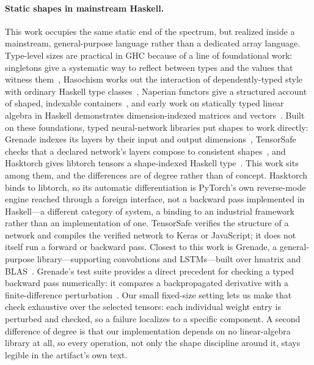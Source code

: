 \documentclass[sigconf,nonacm]{acmart}
\begin{document}
\paragraph{Static shapes in mainstream Haskell.}
This work occupies the same static end of the spectrum, but realized inside a
mainstream, general-purpose language rather than a dedicated array language.
Type-level sizes are practical in GHC because of a line of foundational work:
singletons give a systematic way to reflect between types and the values that
witness them~\cite{eisenberg2012singletons}, Hasochism works out the
interaction of dependently-typed style with ordinary Haskell type
classes~\cite{lindley2013hasochism}, Naperian functors give a structured
account of shaped, indexable containers~\cite{gibbons2017naperian}, and early
work on statically typed linear algebra in Haskell demonstrates
dimension-indexed matrices and vectors~\cite{eaton2006linalg}. Built on these
foundations, typed neural-network libraries put shapes to work directly:
Grenade indexes its layers by their input and output
dimensions~\cite{campbell2016grenade}, TensorSafe checks that a declared
network's layers compose to consistent shapes~\cite{pineyro2019tensorsafe,
pineyro2021tensorsafe}, and Hasktorch gives libtorch tensors a shape-indexed
Haskell type~\cite{hasktorch}. This work sits among them, and the differences
are of degree rather than of concept. Hasktorch binds to libtorch, so its
automatic differentiation is PyTorch's own reverse-mode engine reached through
a foreign interface, not a backward pass implemented in Haskell---a different
category of system, a binding to an industrial framework rather than an
implementation of one. TensorSafe verifies the structure of a network and
compiles the verified network to Keras or JavaScript; it does not itself run a
forward or backward pass. Closest to this work is Grenade, a general-purpose
library---supporting convolutions and LSTMs---built over hmatrix and
BLAS~\cite{hmatrix}. Grenade's test suite provides a direct precedent for
checking a typed backward pass numerically: it compares a backpropagated
derivative with a finite-difference perturbation~\cite{campbell2016grenade}.
Our small fixed-size setting lets us make that check exhaustive over the
selected tensors: each individual weight entry is perturbed and checked, so a
failure localizes to a specific component. A second difference of degree is
that our implementation depends on no linear-algebra library at all, so every
operation, not only the shape discipline around it, stays legible in the
artifact's own text.
\end{document}
